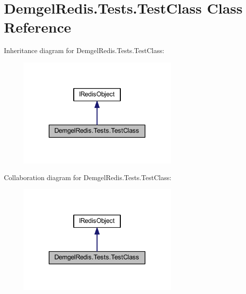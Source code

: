 \hypertarget{class_demgel_redis_1_1_tests_1_1_test_class}{}\section{Demgel\+Redis.\+Tests.\+Test\+Class Class Reference}
\label{class_demgel_redis_1_1_tests_1_1_test_class}


Inheritance diagram for Demgel\+Redis.\+Tests.\+Test\+Class\+:
\nopagebreak
\begin{figure}[H]
\begin{center}
\leavevmode
\includegraphics[width=228pt]{class_demgel_redis_1_1_tests_1_1_test_class__inherit__graph}
\end{center}
\end{figure}


Collaboration diagram for Demgel\+Redis.\+Tests.\+Test\+Class\+:
\nopagebreak
\begin{figure}[H]
\begin{center}
\leavevmode
\includegraphics[width=228pt]{class_demgel_redis_1_1_tests_1_1_test_class__coll__graph}
\end{center}
\end{figure}

